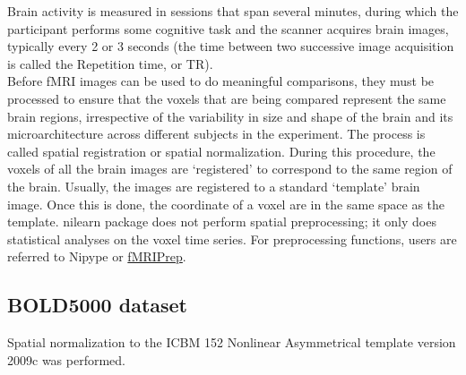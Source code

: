\documentclass[12pt]{article}
\begin{document}
Brain activity is measured in sessions that span several minutes, during which the participant performs some cognitive task and the scanner acquires brain images, typically every 2 or 3 seconds (the time between two successive image acquisition is called the Repetition time, or TR). \\ 

Before fMRI images can be used to do meaningful comparisons, they must be processed to ensure that the voxels that are being compared represent the same brain regions, irrespective of the variability in size and shape of the brain and its microarchitecture across different subjects in the experiment. The process is called spatial registration or spatial normalization. During this procedure, the voxels of all the brain images are ‘registered’ to correspond to the same region of the brain. Usually, the images are registered to a standard ‘template’ brain image.
Once this is done, the coordinate of a voxel are in the same space as the template. nilearn package does not perform spatial preprocessing; it only does statistical analyses on the voxel time series. For preprocessing functions, users are referred to Nipype or \href{https://fmriprep.org/en/stable/}{fMRIPrep}. 

\subsection{BOLD5000 dataset}


Spatial normalization to the ICBM 152 Nonlinear Asymmetrical template version 2009c was performed. 

\printbibliography
\end{document}
